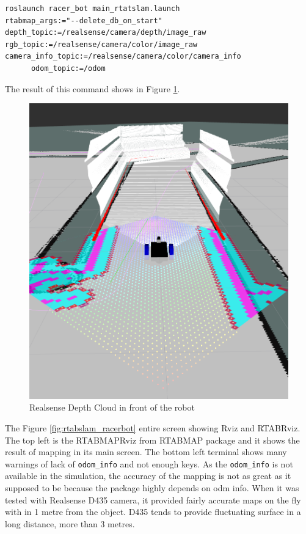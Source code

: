 \documentclass[10pt,journal,compsoc]{IEEEtran}
\begin{document}
\begin{lstlisting}[language={[Sharp]C}, caption={RTABMAP integrated racerbot launch command},label={list:RTABMAPracerbotlaunch}]
roslaunch racer_bot main_rtatslam.launch
rtabmap_args:="--delete_db_on_start" 
depth_topic:=/realsense/camera/depth/image_raw
rgb_topic:=/realsense/camera/color/image_raw
camera_info_topic:=/realsense/camera/color/camera_info
      odom_topic:=/odom
\end{lstlisting}

The result of this command shows in Figure \ref{fig:racer_bot_DepthCloud}.
\begin{figure}[thpb]
      \centering
      \includegraphics[width=\linewidth]{./img/racer_bot_DepthCloud.png}
      \caption{Realsense Depth Cloud in front of the robot}
      \label{fig:racer_bot_DepthCloud}
\end{figure}
The Figure \ref{fig:rtabslam_racerbot} entire screen showing Rviz and RTABRviz. The top left is the RTABMAPRviz from RTABMAP package and it shows the result of mapping in its main screen. The bottom left terminal shows many warnings of lack of \verb!odom_info! and not enough keys. As the \verb!odom_info! is not available in the simulation, the accuracy of the mapping is not as great as it supposed to be because the package highly depends on odm info. When it was tested with Realsense D435 camera, it provided fairly accurate maps on the fly with in 1 metre from the object. D435 tends to provide fluctuating surface in a long distance, more than 3 metres.
\end{document}
